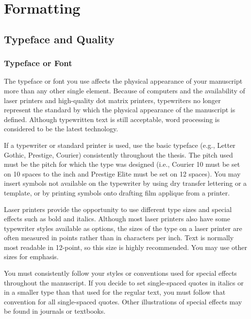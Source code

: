 \chapter{Formatting}
\label{chap:Formatting}

\section{Typeface and Quality}
\label{sec:TypefaceAndQuality}


\subsection{Typeface or Font}
\label{sec:TypefaceOrFont}

The typeface or font you use affects the physical appearance of your
manuscript more than any other single element. Because of computers
and the availability of laser printers and high-quality dot matrix
printers, typewriters no longer represent the standard by which the
physical appearance of the manuscript is defined. Although typewritten
text is still acceptable, word processing is considered to be the
latest technology.

If a typewriter or standard printer is used, use the basic typeface
(e.g., Letter Gothic, Prestige, Courier) consistently throughout the
thesis. The pitch used must be the pitch for which the type was
designed (i.e., Courier 10 must be set on 10 spaces to the inch and
Prestige Elite must be set on 12 spaces). You may insert symbols not
available on the typewriter by using dry transfer lettering or a
template, or by printing symbols onto drafting film applique from a
printer.

Laser printers provide the opportunity to use different type sizes and
special effects such as bold and italics. Although most laser printers
also have some typewriter styles available as options, the sizes of
the type on a laser printer are often measured in points rather than
in characters per inch. Text is normally most readable in 12-point, so
this size is highly recommended. You may use other sizes for emphasis.

You must consistently follow your styles or conventions used for
special effects throughout the manuscript. If you decide to set
single-spaced quotes in italics or in a smaller type than that used
for the regular text, you must follow that convention for all
single-spaced quotes. Other illustrations of special effects may be
found in journals or textbooks.

